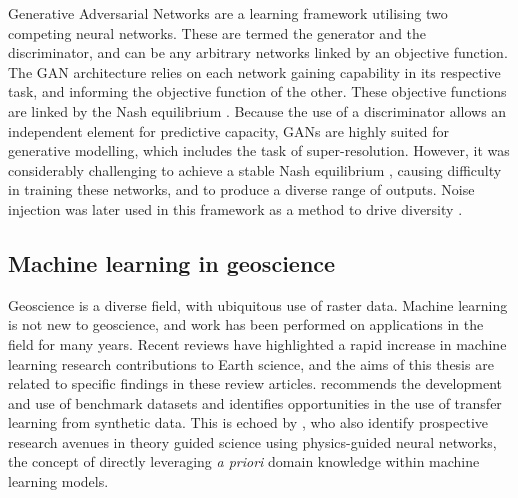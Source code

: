 Generative Adversarial Networks \parencite{goodfellowGenerativeAdversarialNets2014} are a learning framework utilising two competing neural networks.
These are termed the generator and the discriminator, and can be any arbitrary networks linked by an objective function.
The GAN architecture relies on each network gaining capability in its respective task, and informing the objective function of the other.
These objective functions are linked by the Nash equilibrium \parencite{salimansImprovedTechniquesTraining2016,lucicAreGANsCreated2018}.
Because the use of a discriminator allows an independent element for predictive capacity, GANs are highly suited for generative modelling, which includes the task of super-resolution.
However, it was considerably challenging to achieve a stable Nash equilibrium \parencite{salimansImprovedTechniquesTraining2016}, causing difficulty in training these networks, and to produce a diverse range of outputs.
Noise injection was later used in this framework as a method to drive diversity \parencite{karrasStylebasedGeneratorArchitecture2018,rakotonirinaESRGANFurtherImproving2020}.



\subsection{Machine learning in geoscience}
\label{sec:introgeoml}

Geoscience is a diverse field, with ubiquitous use of raster data.
Machine learning is not new to geoscience, and work has been performed on applications in the field for many years.
Recent reviews have highlighted a rapid increase in machine learning research contributions to Earth science, and the aims of this thesis are related to specific findings in these review articles.
\textcite{bergenMachineLearningDatadriven2019} recommends the development and use of benchmark datasets and identifies opportunities in the use of transfer learning from synthetic data.
This is echoed by \textcite{karpatneMachineLearningGeosciences2019}, who also identify prospective research avenues in theory guided science using physics-guided neural networks, the concept of directly leveraging \emph{a priori} domain knowledge within machine learning models.

